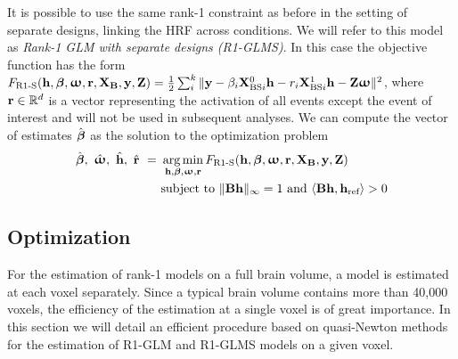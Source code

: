 It is possible to use the same rank-1
constraint as before in the setting of separate designs, linking the HRF 
across conditions. We will refer to this model as \emph{Rank-1 GLM with separate designs (R1-GLMS)}. In this case the objective function has the form
$F_{\text{R1-S}}(\mathbf{h}, {\boldsymbol \beta}, {\boldsymbol \upomega}, \mathbf{r}, \mathbf{X}_{\mathbf{B}}, \mathbf{y}, \mathbf{Z}) = \frac{1}{2}\sum_i^k \|\mathbf{y} - \beta_i \mathbf{X}^0_{\text{BS}i} \mathbf{h} - r_i \mathbf{X}^1_{\text{BS}i} \mathbf{h} - \mathbf{Z} {\boldsymbol \upomega}\| ^2 $, where $\mathbf{r} \in {\mathbb R}^d$ is a vector representing the activation of all events except the event of interest and 
will not be used in subsequent analyses. We can 
compute the vector of estimates $\hat{{{\boldsymbol \beta}}}$ as the solution to the optimization
problem
%
\begin{eqnarray}
\label{eq:r1_separate}
\begin{aligned}
\hat{\bfbeta}, ~\hat{\bfomega},~\hat{\B{h}},~\hat{\bf{r}} ~= ~&\argmin_{\B{h}, \bfbeta, \bfomega, \B{r}} F_{\text{R1-S}}(\B{h}, \bfbeta, \bfomega, \B{r}, \B{X}_{\B{B}}, \B{y}, \B{Z}) \\
&\text{subject to } \|\B{B} \B{h}\|_{\infty} = 1 \text{ and } \langle \B{B} \B{h}, \B{h}_{\text{ref}} \rangle > 0
\end{aligned}
\end{eqnarray}
%


\subsection{Optimization}
\label{sub:optim}


For the estimation of rank-1 models on a full brain volume, a  model is estimated at each voxel separately. Since a typical brain volume contains more than 40,000 voxels, the efficiency of the estimation at a single voxel is of great importance. In this section we will detail an efficient procedure based on quasi-Newton methods for the estimation of R1-GLM and R1-GLMS models on a given voxel.


